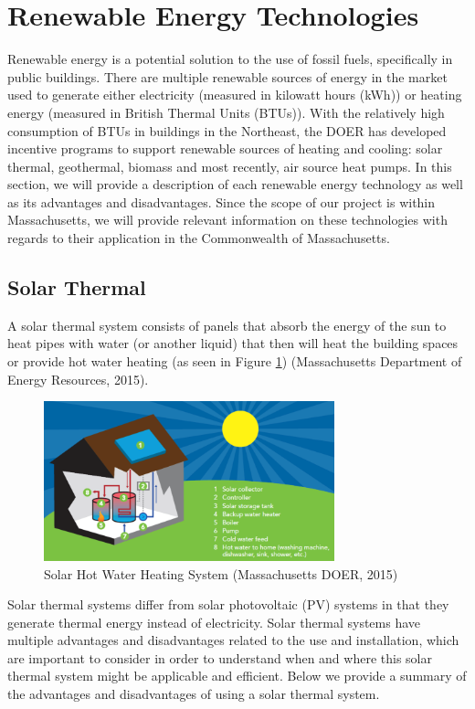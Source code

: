   \section{Renewable Energy Technologies}
  \par Renewable energy is a potential solution to the use of fossil fuels, specifically in public buildings. There are multiple renewable sources of energy in the market used to generate either electricity (measured in kilowatt hours (kWh)) or heating energy (measured in British Thermal Units (BTUs)). With the relatively high consumption of BTUs in buildings in the Northeast, the DOER has developed incentive programs to support renewable sources of heating and cooling: solar thermal, geothermal, biomass and most recently, air source heat pumps. In this section, we will provide a description of each renewable energy technology as well as its advantages and disadvantages. Since the scope of our project is within Massachusetts, we will provide relevant information on these technologies with regards to their application in the Commonwealth of Massachusetts. 

    \subsection{Solar Thermal}
    \par A solar thermal system consists of panels that absorb the energy of the sun to heat pipes with water (or another liquid) that then will heat the building spaces or provide hot water heating (as seen in Figure \ref{fig:solar}) (Massachusetts Department of Energy Resources, 2015).
    \begin{figure}[h]
      \centering
        \includegraphics[width=0.75\textwidth]{images/03-SolarHotWaterHeatingSystem}
      \caption{Solar Hot Water Heating System (Massachusetts DOER, 2015)}
      \label{fig:solar}
    \end{figure}
    \par Solar thermal systems differ from solar photovoltaic (PV) systems in that they generate thermal energy instead of electricity. Solar thermal systems have multiple advantages and disadvantages related to the use and installation, which are important to consider in order to understand when and where this solar thermal system might be applicable and efficient. Below we provide a summary of the advantages and disadvantages of using a solar thermal system.\\

